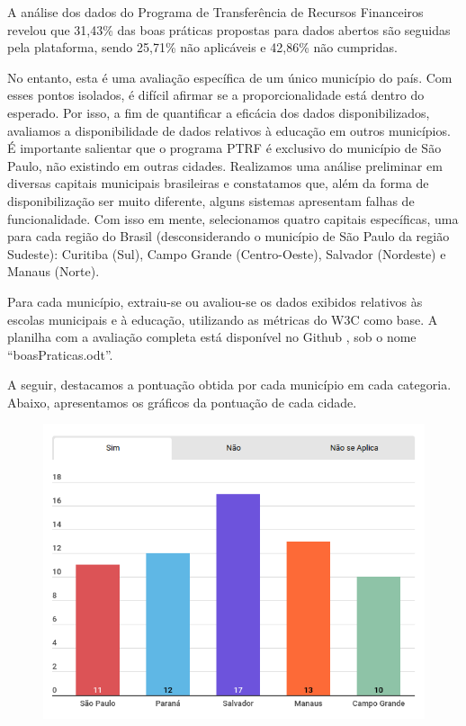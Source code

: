 A análise dos dados do Programa de Transferência de Recursos Financeiros revelou que 31,43\% das boas práticas propostas para dados abertos são seguidas pela plataforma, sendo 25,71\% não aplicáveis e 42,86\% não cumpridas.

No entanto, esta é uma avaliação específica de um único município do país. Com esses pontos isolados, é difícil afirmar se a proporcionalidade está dentro do esperado. Por isso, a fim de quantificar a eficácia dos dados disponibilizados, avaliamos a disponibilidade de dados relativos à educação em outros municípios. É importante salientar que o programa PTRF é exclusivo do município de São Paulo, não existindo em outras cidades. Realizamos uma análise preliminar em diversas capitais municipais brasileiras e constatamos que, além da forma de disponibilização ser muito diferente, alguns sistemas apresentam falhas de funcionalidade. Com isso em mente, selecionamos quatro capitais específicas, uma para cada região do Brasil (desconsiderando o município de São Paulo da região Sudeste): Curitiba (Sul), Campo Grande (Centro-Oeste), Salvador (Nordeste) e Manaus (Norte).

Para cada município, extraiu-se ou avaliou-se os dados exibidos relativos às escolas municipais e à educação, utilizando as métricas do W3C como base. A planilha com a avaliação completa está disponível no Github \cite{GitHub}, sob o nome ``boasPraticas.odt''.

A seguir, destacamos a pontuação obtida por cada município em cada categoria. Abaixo, apresentamos os gráficos da pontuação de cada cidade.

\begin{figure}[H]
    \centering
    \includegraphics[scale=0.5]{images/grafico2.png}
    \label{fig:3}
\end{figure}

